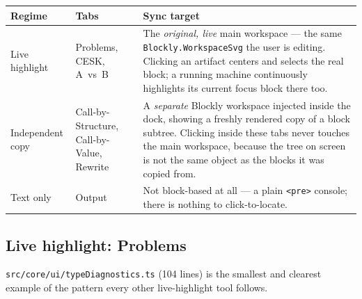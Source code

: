 \documentclass[11pt]{article}
\begin{document}
\begin{center}
\begin{longtable}{@{}p{2.6cm}p{4.4cm}p{7.6cm}@{}}
\toprule
\textbf{Regime} & \textbf{Tabs} & \textbf{Sync target} \\
\midrule
\endhead
Live highlight &
  Problems, CESK, A~vs~B &
  The \emph{original, live} main workspace --- the same
  \texttt{Blockly.WorkspaceSvg} the user is editing. Clicking an artifact
  centers and selects the real block; a running machine continuously
  highlights its current focus block there too. \\
Independent copy &
  Call-by-Structure, Call-by-Value, Rewrite &
  A \emph{separate} Blockly workspace injected inside the dock, showing a
  freshly rendered copy of a block subtree. Clicking inside these tabs
  never touches the main workspace, because the tree on screen is not the
  same object as the blocks it was copied from. \\
Text only &
  Output &
  Not block-based at all --- a plain \texttt{<pre>} console; there is
  nothing to click-to-locate. \\
\bottomrule
\end{longtable}
\end{center}

\subsection{Live highlight: Problems}
\label{sec:problems}

\texttt{src/core/ui/typeDiagnostics.ts} (104 lines) is the smallest and
clearest example of the pattern every other live-highlight tool follows.
\end{document}
